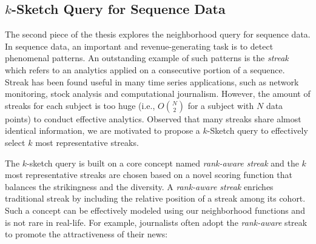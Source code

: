 \subsection{$k$-Sketch Query for Sequence Data}
The second piece of the thesis explores the neighborhood
query for sequence data. In sequence data, an important
and revenue-generating task is to detect phenomenal patterns.
An outstanding example of such patterns is the \emph{streak}
which refers to an analytics applied on a consecutive portion of a sequence. 
Streak has been found useful in many time series applications,
such as network monitoring, stock analysis
and computational journalism. 
However, the amount of streaks for each subject
is too huge (i.e., $O{N \choose 2}$ for a subject with $N$ data points) 
to conduct effective analytics. Observed that
many streaks share almost identical information, we are motivated 
to propose a $k$-Sketch
query to effectively select $k$ most representative streaks.

The $k$-sketch query is built on a core concept named \emph{rank-aware streak}
and the $k$ most representative streaks are chosen based on a novel scoring function
that balances the strikingness and the diversity. A \emph{rank-aware streak}
enriches traditional streak by including the
relative position of a streak among its cohort.
Such a concept can be
effectively modeled using our neighborhood functions and is not rare in real-life.
For example, journalists often adopt the \emph{rank-aware} streak to promote
the attractiveness of their news:


